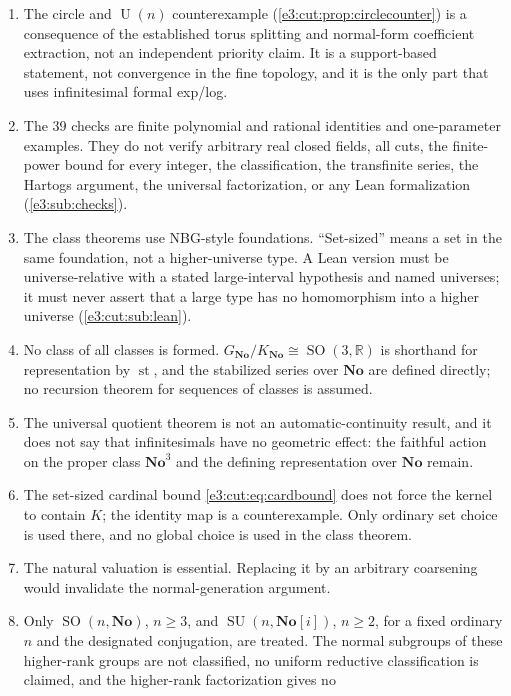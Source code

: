 \documentclass[11pt,letterpaper]{article}
\numberwithin{equation}{section}
\theoremstyle{definition}
\theoremstyle{remark}
\newcommand{\No}{\mathbf{No}}
\newcommand{\R}{\mathbb R}
\newcommand{\st}{\operatorname{st}}
\newcommand{\SO}{\operatorname{SO}}
\newcommand{\SU}{\operatorname{SU}}
\newcommand{\Un}{\operatorname{U}}
\begin{document}
\begin{enumerate}[label=\textup{C\arabic*.},leftmargin=2.6em]
 not a first-order formula without parameters, is not a classification of
 fields by value group, and is restricted to set-sized fields.
\item The circle and $\Un(n)$ counterexample
 (\cref{e3:cut:prop:circlecounter}) is a consequence of the established torus
 splitting and normal-form coefficient extraction, not an independent priority
 claim. It is a support-based statement, not convergence in the fine topology,
 and it is the only part that uses infinitesimal formal exp/log.
\item The 39 checks are finite polynomial and rational identities and
 one-parameter examples. They do not verify arbitrary real closed fields, all
 cuts, the finite-power bound for every integer, the classification, the
 transfinite series, the Hartogs argument, the universal factorization, or any
 Lean formalization (\cref{e3:sub:checks}).
\item The class theorems use NBG-style foundations. ``Set-sized'' means a set in
 the same foundation, not a higher-universe type. A Lean version must be
 universe-relative with a stated large-interval hypothesis and named
 universes; it must never assert that a large type has no homomorphism into a
 higher universe (\cref{e3:cut:sub:lean}).
\item No class of all classes is formed. $G_{\No}/K_{\No}\cong\SO(3,\R)$ is
 shorthand for representation by $\st$, and the stabilized series over $\No$ are
 defined directly; no recursion theorem for sequences of classes is assumed.
\item The universal quotient theorem is not an automatic-continuity result, and
 it does not say that infinitesimals have no geometric effect: the faithful
 action on the proper class $\No^3$ and the defining representation over $\No$
 remain.
\item The set-sized cardinal bound \cref{e3:cut:eq:cardbound} does not force the
 kernel to contain $K$; the identity map is a counterexample. Only ordinary set
 choice is used there, and no global choice is used in the class theorem.
\item The natural valuation is essential. Replacing it by an arbitrary
 coarsening would invalidate the normal-generation argument.
\item Only $\SO(n,\No)$, $n\ge3$, and $\SU(n,\No[i])$, $n\ge2$, for a fixed
 ordinary $n$ and the designated conjugation, are treated. The normal subgroups
 of these higher-rank groups are not classified, no uniform reductive
 classification is claimed, and the higher-rank factorization gives no

\end{enumerate}
\end{document}
